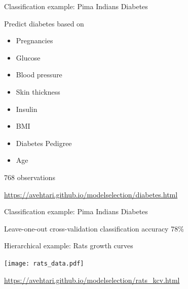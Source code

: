 \documentclass[english,t]{beamer}
\begin{document}
\begin{frame}{}

  {\Large\color{navyblue} Classification example: Pima Indians Diabetes}

  Predict diabetes based on
  \begin{itemize}
  \item Pregnancies
  \item Glucose
  \item Blood pressure
  \item Skin thickness
  \item Insulin
  \item BMI
  \item Diabetes Pedigree
  \item Age
  \end{itemize}

  768 observations

  \vspace{2\baselineskip}

  \url{https://avehtari.github.io/modelselection/diabetes.html}
  
\end{frame}

\begin{frame}{}

  {\Large\color{navyblue} Classification example: Pima Indians Diabetes}

  Leave-one-out cross-validation classification accuracy 78\%

  
\end{frame}

\begin{frame}{}

  {\Large\color{navyblue} Hierarchical example: Rats growth curves}

  \texttt{[image: rats\_data.pdf]}

  \url{https://avehtari.github.io/modelselection/rats_kcv.html}
  
\end{frame}
\end{document}
